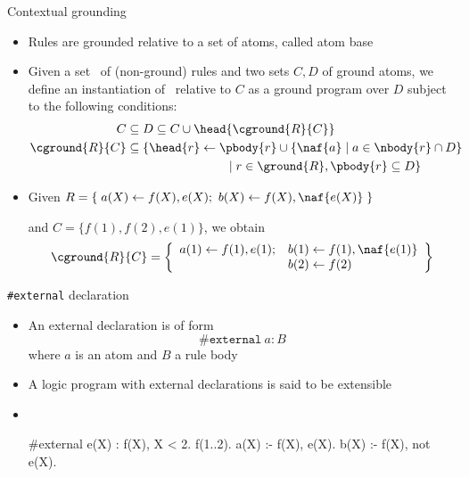 \begin{frame}{Contextual grounding}
  \begin{itemize}
  \item <1-> Rules are grounded relative to a set of atoms, called \alert{atom base}
  \item <2->
    Given a set \RRG\ of (non-ground) rules and two sets $C,D$ of ground atoms,
    we define an instantiation of \RRG\ relative to $C$ as a ground program  over $D$
    subject to the following conditions:
    \begin{align*}
      C& {}\subseteq D\subseteq C \cup\head{\cground{\RRG}{C}}
      \\
      \cground{\RRG}{C}& {} \subseteq
                         \{
                         \head{r}\leftarrow\pbody{r}\cup \{\naf{a} \mid a\in\nbody{r}\cap D\}
      \\&\qquad\qquad\qquad\qquad
          \mid
          r\in \ground{\RRG},
          \pbody{r}\subseteq D
          \}
    \end{align*}
  \item <3->  Given
    \(
    R= \{\; a(X) \leftarrow f(X), e(X);\ b(X) \leftarrow f(X), \naf{e(X)} \;\}
    \)

    and
    \(
    C=\{f(1),f(2),e(1)\}
    \),
    we obtain
    \[
    \cground{R}{C}
    =
    \left\{
      \begin{array}{ll}
        a(1) \leftarrow f(1), e(1); & b(1) \leftarrow f(1), \naf{e(1)}\\
                                    & b(2) \leftarrow f(2)
      \end{array}
    \right\}
    \]
  \end{itemize}
\end{frame}
\begin{frame}[fragile]{\texttt{\#external} declaration}
  \begin{itemize}
  \item<1-> An \alert{external declaration} is of form
    \[ %
      \texttt{\#external}~a : B
    \] %
    where $a$ is an atom and $B$ a rule body
  \item <2->
    A logic program with external declarations is said to be \alert<2>{extensible}
    \medskip
  \item <3->  \
    \begin{minipage}[t]{0.5\linewidth}
      \begin{semiverbatim}
        #external e(X) : f(X), X < 2.
        f(1..2).
        a(X) :- f(X), e(X).
        b(X) :- f(X), not e(X).
      \end{semiverbatim}
    \end{minipage}
  \end{itemize}
\end{frame}

